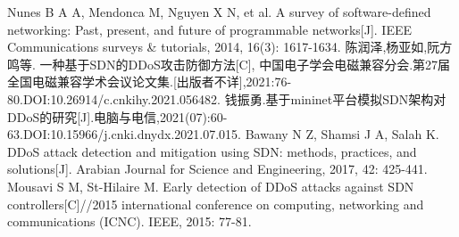 \renewcommand{\baselinestretch}{\yuanbeishu} %
\normalsize{}                         %
\begin{multicols}{2} 
\begin{thebibliography}{9}                   %

	Nunes B A A, Mendonca M, Nguyen X N, et al. A survey of software-defined networking: Past, present, and future of programmable networks[J]. IEEE Communications surveys \& tutorials, 2014, 16(3): 1617-1634.
	陈润泽,杨亚如,阮方鸣等. 一种基于SDN的DDoS攻击防御方法[C], 中国电子学会电磁兼容分会.第27届全国电磁兼容学术会议论文集.[出版者不详],2021:76-80.DOI:10.26914/c.cnkihy.2021.056482.
	钱振勇.基于mininet平台模拟SDN架构对DDoS的研究[J].电脑与电信,2021(07):60-63.DOI:10.15966/j.cnki.dnydx.2021.07.015.
	Bawany N Z, Shamsi J A, Salah K. DDoS attack detection and mitigation using SDN: methods, practices, and solutions[J]. Arabian Journal for Science and Engineering, 2017, 42: 425-441.
	Mousavi S M, St-Hilaire M. Early detection of DDoS attacks against SDN controllers[C]//2015 international conference on computing, networking and communications (ICNC). IEEE, 2015: 77-81.

\end{thebibliography}
\end{multicols}
